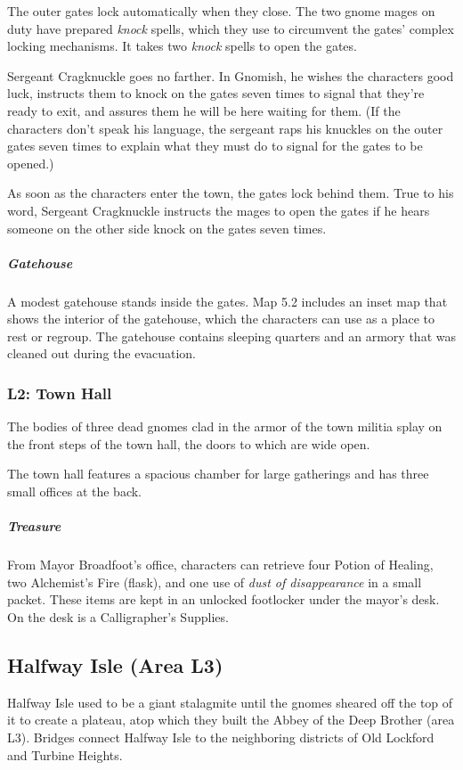 \documentclass[10pt,a4paper,twoside,bg=print,twocolumn,openany,nodeprecatedcode]{dndbook}
\begin{document}
The outer gates lock automatically when they close. The two gnome mages on duty have prepared \textit{knock} spells, which they use to circumvent the gates' complex locking mechanisms. It takes two \textit{knock} spells to open the gates.

Sergeant Cragknuckle goes no farther. In Gnomish, he wishes the characters good luck, instructs them to knock on the gates seven times to signal that they're ready to exit, and assures them he will be here waiting for them. (If the characters don't speak his language, the sergeant raps his knuckles on the outer gates seven times to explain what they must do to signal for the gates to be opened.)

As soon as the characters enter the town, the gates lock behind them. True to his word, Sergeant Cragknuckle instructs the mages to open the gates if he hears someone on the other side knock on the gates seven times.

\subparagraph{Gatehouse}
A modest gatehouse stands inside the gates. Map 5.2 includes an inset map that shows the interior of the gatehouse, which the characters can use as a place to rest or regroup. The gatehouse contains sleeping quarters and an armory that was cleaned out during the evacuation.

\subsubsection{L2: Town Hall}
\begin{DndReadAloud}{}
The bodies of three dead gnomes clad in the armor of the town militia splay on the front steps of the town hall, the doors to which are wide open.

\end{DndReadAloud}

The town hall features a spacious chamber for large gatherings and has three small offices at the back.

\subparagraph{Treasure}
From Mayor Broadfoot's office, characters can retrieve four Potion of Healing, two Alchemist's Fire (flask), and one use of \textit{dust of disappearance} in a small packet. These items are kept in an unlocked footlocker under the mayor's desk. On the desk is a Calligrapher's Supplies.

\subsection{Halfway Isle (Area L3)}
Halfway Isle used to be a giant stalagmite until the gnomes sheared off the top of it to create a plateau, atop which they built the Abbey of the Deep Brother (area L3). Bridges connect Halfway Isle to the neighboring districts of Old Lockford and Turbine Heights.
\end{document}
